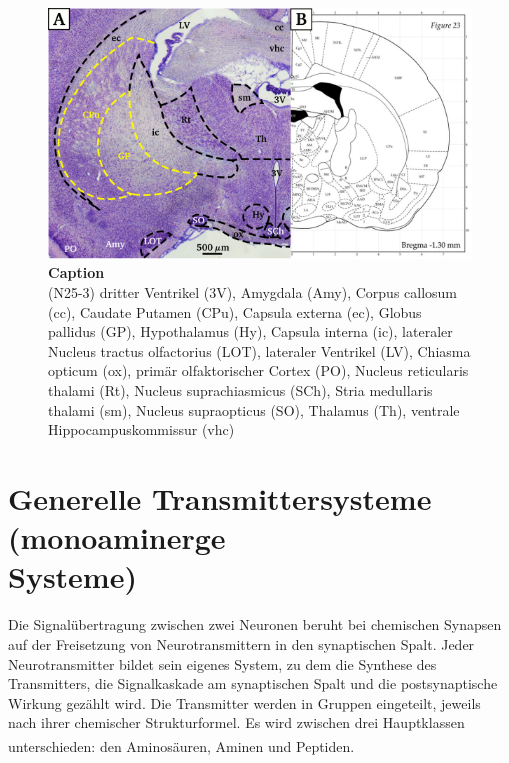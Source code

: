 \documentclass[12pt,a4paper,pdftex]{article}
\begin{document}
\begin{figure}[H]
    \centering
    \includegraphics{pictures/Basalganglia/GP_CPu.png}
    \caption[Caption]{\textbf{Caption}\\
    (N25-3)
    dritter Ventrikel (3V), Amygdala (Amy), Corpus callosum (cc), Caudate Putamen (CPu), Capsula externa (ec), Globus pallidus (GP), Hypothalamus (Hy), Capsula interna (ic), lateraler Nucleus tractus olfactorius (LOT), lateraler Ventrikel (LV), Chiasma opticum (ox), primär olfaktorischer Cortex (PO),  Nucleus reticularis thalami (Rt), Nucleus suprachiasmicus (SCh), Stria medullaris thalami (sm), Nucleus supraopticus (SO), Thalamus (Th), ventrale Hippocampuskommissur (vhc)}
    \label{fig:GP_CPu}
\end{figure}

\newpage
\section[Generelle Transmittersysteme (monoaminerge Systeme)]{Generelle Transmittersysteme (monoaminerge \\Systeme)}
\label{sec:transmittersysteme}

Die Signalübertragung zwischen zwei Neuronen beruht bei chemischen Synapsen auf der Freisetzung von Neurotransmittern in den synaptischen Spalt. Jeder Neurotransmitter bildet sein eigenes System, zu dem die Synthese des Transmitters, die Signalkaskade am synaptischen Spalt und die postsynaptische Wirkung gezählt wird. 
Die Transmitter werden in Gruppen eingeteilt, jeweils nach ihrer chemischer Strukturformel. Es wird zwischen drei Hauptklassen unterschieden: den Aminosäuren, Aminen und Peptiden. \textsuperscript{\cite[6]{neurowissenschaften_baer}}
\end{document}

